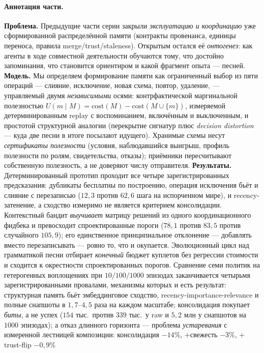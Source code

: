 \documentclass{article}
\begin{document}
\paragraph{Аннотация части.} \textbf{Проблема.} Предыдущие части серии закрыли
\emph{эксплуатацию и координацию} уже сформированной распределённой
памяти (контракты провенанса, единицы переноса, правила
merge/trust/staleness). Открытым остался её \emph{онтогенез}: как
агенты в ходе совместной деятельности обучаются тому, что достойно
запоминания, что становится ориентиром и какой фрагмент опыта ---
песней.
\textbf{Модель.} Мы определяем формирование памяти как ограниченный
выбор из пяти операций --- слияние, исключение, новая схема, повтор,
удаление, --- управляемый двумя \emph{независимыми} осями:
контрфактической маргинальной полезностью $U(m \mid M) =
\mathrm{cost}(M) - \mathrm{cost}(M \cup \{m\})$, измеряемой
детерминированным replay с воспоминанием, включённым и выключенным, и
простотой структурной аналогии (перекрытие сигнатур плюс
\emph{decision distortion} --- куда две песни в итоге посылают
идущего). Хранимые схемы несут \emph{сертификаты полезности}
(условия, наблюдавшийся выигрыш, профиль полезности по ролям,
свидетельства, отказы); приёмники пересчитывают собственную
полезность, а не доверяют числу отправителя.
\textbf{Результаты.} Детерминированный прототип проходит все четыре
зарегистрированных предсказания: дубликаты бесплатны по построению,
операция исключения бьёт и слияние с перезаписью ($12{,}3$ против
$62{,}6$ шага на испорченном мире), и recency-затенение, а сходство
измеримо не является критерием консолидации. Контекстный бандит
\emph{выучивает} матрицу решений из одного координационного фидбека и
превосходит спроектированные пороги ($78{,}1$ против $83{,}5$ против
случайного $105{,}9$); его единственное принципиальное отклонение ---
добавлять вместо перезаписывать --- ровно то, что и окупается.
Эволюционный цикл над грамматикой песни отбирает \emph{конечный}
бюджет куплетов без регрессии стоимости и сходится к окрестности
спроектированных порогов. Сравнение семи политик на гетерогенных
воплощениях при $10/100/1000$ эпизодах заканчивается четырьмя
зарегистрированными провалами, механизмы которых и есть результат:
структурная память бьёт эмбеддинговое сходство,
recency-importance-relevance и полные снапшоты в $1{,}7$--$4{,}5$
раза на каждом масштабе; консолидация покупает \emph{биты}, а не
успех ($154$ тыс.\ против $339$ тыс.\ у raw и $5{,}2$ млн у
снапшотов на $1000$ эпизодах); а отказ длинного горизонта ---
проблема \emph{устаревания} с измеренной лестницей композиции:
консолидация $-14\%$, $+$свежесть $-3\%$, $+$trust-flip $-0{,}9\%$
\end{document}
